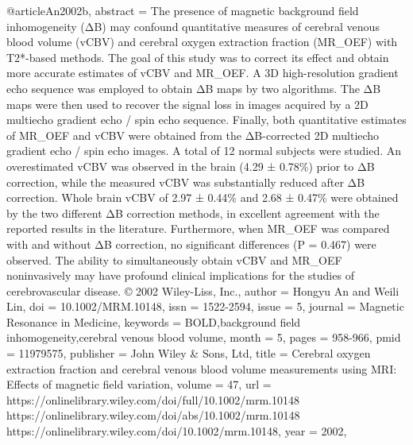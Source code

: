 @article{An2002b,
   abstract = {The presence of magnetic background field inhomogeneity (ΔB) may confound quantitative measures of cerebral venous blood volume (vCBV) and cerebral oxygen extraction fraction (MR_OEF) with T2*-based methods. The goal of this study was to correct its effect and obtain more accurate estimates of vCBV and MR_OEF. A 3D high-resolution gradient echo sequence was employed to obtain ΔB maps by two algorithms. The ΔB maps were then used to recover the signal loss in images acquired by a 2D multiecho gradient echo / spin echo sequence. Finally, both quantitative estimates of MR_OEF and vCBV were obtained from the ΔB-corrected 2D multiecho gradient echo / spin echo images. A total of 12 normal subjects were studied. An overestimated vCBV was observed in the brain (4.29 ± 0.78\%) prior to ΔB correction, while the measured vCBV was substantially reduced after ΔB correction. Whole brain vCBV of 2.97 ± 0.44\% and 2.68 ± 0.47\% were obtained by the two different ΔB correction methods, in excellent agreement with the reported results in the literature. Furthermore, when MR_OEF was compared with and without ΔB correction, no significant differences (P = 0.467) were observed. The ability to simultaneously obtain vCBV and MR_OEF noninvasively may have profound clinical implications for the studies of cerebrovascular disease. © 2002 Wiley-Liss, Inc.},
   author = {Hongyu An and Weili Lin},
   doi = {10.1002/MRM.10148},
   issn = {1522-2594},
   issue = {5},
   journal = {Magnetic Resonance in Medicine},
   keywords = {BOLD,background field inhomogeneity,cerebral venous blood volume},
   month = {5},
   pages = {958-966},
   pmid = {11979575},
   publisher = {John Wiley & Sons, Ltd},
   title = {Cerebral oxygen extraction fraction and cerebral venous blood volume measurements using MRI: Effects of magnetic field variation},
   volume = {47},
   url = {https://onlinelibrary.wiley.com/doi/full/10.1002/mrm.10148 https://onlinelibrary.wiley.com/doi/abs/10.1002/mrm.10148 https://onlinelibrary.wiley.com/doi/10.1002/mrm.10148},
   year = {2002},
}